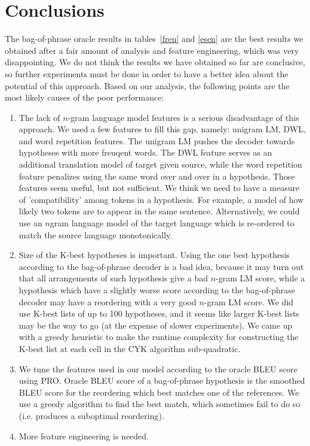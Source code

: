 \documentclass[11pt]{article}
\numberwithin{equation}{section}
\begin{document}
\section{Conclusions}
\label{sec:conclusions}
The bag-of-phrase oracle results in tables~\ref{fren} and \ref{esen} are the best results we obtained after a fair amount of analysis and feature engineering, which was very disappointing. We do not think the results we have obtained so far are conclusive, so further experiments must be done in order to have a better idea about the potential of this approach. Based on our analysis, the following points are the most likely causes of the poor performance:
\begin{enumerate}
\item The lack of $n$-gram language model features is a serious disadvantage of this approach. We used a few features to fill this gap, namely: unigram LM, DWL, and word repetition features. The unigram LM pushes the decoder towards hypotheses with more freuqent words. The DWL feature serves as an additional translation model of target given source, while the word repetition feature penalizes using the same word over and over in a hypothesis. Those features seem useful, but not sufficient. We think we need to have a measure of 'compatibility' among tokens in a hypothesis. For example, a model of how likely two tokens are to appear in the same sentence. Alternatively, we could use an $n$gram language model of the target language which is re-ordered to match the source language monotonically.
\item Size of the K-best hypotheses is important. Using the one best hypothesis according to the bag-of-phrase decoder is a bad idea, because it may turn out that all arrangements of such hypothesis give a bad $n$-gram LM score, while a hypothesis which have a slightly worse score according to the bag-of-phrase decoder may have a reordering with a very good $n$-gram LM score. We did use K-best lists of up to 100 hypotheses, and it seems like larger K-best lists may be the way to go (at the expense of slower experiments). We came up with a greedy heuristic to make the runtime complexity for constructing the K-best list at each cell in the CYK algorithm sub-quadratic.
\item We tune the features used in our model according to the oracle BLEU score using PRO. Oracle BLEU score of a bag-of-phrase hypothesis is the smoothed BLEU score for the reordering which best matches one of the references. We use a greedy algorithm to find the best match, which sometimes fail to do so (i.e. produces a suboptimal reordering).
\item More feature engineering is needed. 
\end{enumerate}
\end{document}
